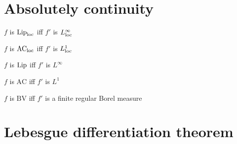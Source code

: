 \documentclass{../note}
\begin{document}
\chapter{Absolutely continuity}

\begin{parts}
\item $f$ is $\operatorname{Lip}_{\mathrm{loc}}$ iff $f'$ is $L_{\mathrm{loc}}^\infty$
\item $f$ is $\textrm{AC}_{\mathrm{loc}}$ iff $f'$ is $L_{\mathrm{loc}}^1$
\end{parts}
\begin{parts}
\item $f$ is $\operatorname{Lip}$ iff $f'$ is $L^\infty$
\item $f$ is $\textrm{AC}$ iff $f'$ is $L^1$
\item $f$ is $\textrm{BV}$ iff $f'$ is a finite regular Borel measure
\end{parts}



\chapter{Lebesgue differentiation theorem}
\end{document}
